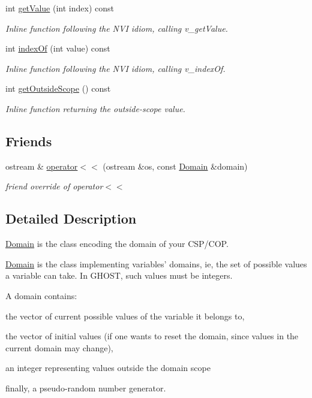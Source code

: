 \begin{DoxyCompactItemize}
int \hyperlink{classghost_1_1Domain_acf7b253ca1c490f90b8f80b5077f9b9c}{get\-Value} (int index) const 
\begin{DoxyCompactList}\small\item\em Inline function following the N\-V\-I idiom, calling v\-\_\-get\-Value. \end{DoxyCompactList}\item 
int \hyperlink{classghost_1_1Domain_ad82154e314a7f1029e5d1512047460fd}{index\-Of} (int value) const 
\begin{DoxyCompactList}\small\item\em Inline function following the N\-V\-I idiom, calling v\-\_\-index\-Of. \end{DoxyCompactList}\item 
int \hyperlink{classghost_1_1Domain_a08e1adce30f095a352a3c1a6937e7660}{get\-Outside\-Scope} () const 
\begin{DoxyCompactList}\small\item\em Inline function returning the outside-\/scope value. \end{DoxyCompactList}\end{DoxyCompactItemize}
\subsection*{Friends}
\begin{DoxyCompactItemize}
\item 
ostream \& \hyperlink{classghost_1_1Domain_a608c9910828eb2983efb65ff4c297a4e}{operator$<$$<$} (ostream \&os, const \hyperlink{classghost_1_1Domain}{Domain} \&domain)
\begin{DoxyCompactList}\small\item\em friend override of operator$<$$<$ \end{DoxyCompactList}\end{DoxyCompactItemize}


\subsection{Detailed Description}
\hyperlink{classghost_1_1Domain}{Domain} is the class encoding the domain of your C\-S\-P/\-C\-O\-P. 

\hyperlink{classghost_1_1Domain}{Domain} is the class implementing variables' domains, ie, the set of possible values a variable can take. In G\-H\-O\-S\-T, such values must be integers.

A domain contains\-:
\begin{DoxyEnumerate}
\item the vector of current possible values of the variable it belongs to,
\item the vector of initial values (if one wants to reset the domain, since values in the current domain may change),
\item an integer representing values outside the domain scope
\item finally, a pseudo-\/random number generator. 
\end{DoxyEnumerate}


